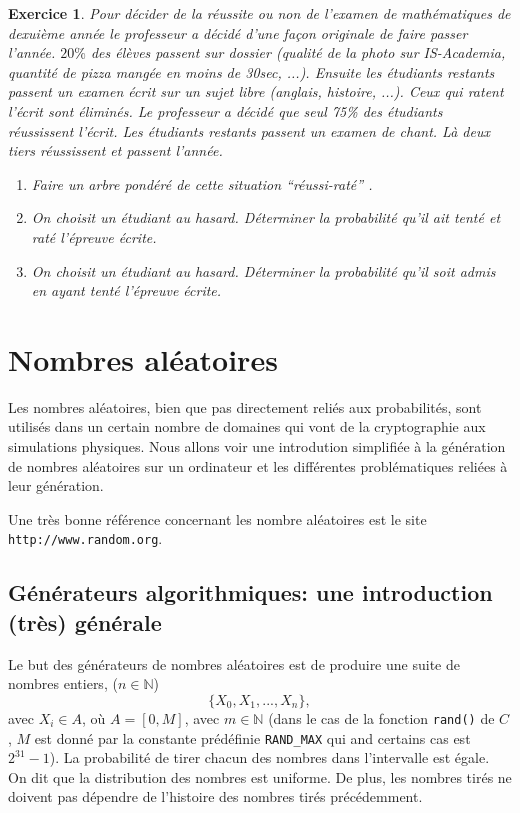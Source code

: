 \documentclass[a4paper,12pt]{book}
\renewcommand{\natural}{\mathbb{N}}
\newtheorem*{exercice}{Exercice}
\begin{document}
\begin{exercice}
Pour décider de la réussite ou non de l'examen de mathématiques de dexuième année le professeur a décidé d'une façon originale de faire passer l'année.
$20\%$ des élèves passent sur dossier (qualité de la photo sur IS-Academia, quantité de pizza mangée en moins de 30sec, ...). Ensuite
les étudiants restants passent un examen écrit sur un sujet libre (anglais, histoire, ...). 
Ceux qui ratent l'écrit sont éliminés. Le professeur
a décidé que seul 75\% des étudiants réussissent l'écrit.
Les étudiants restants passent un examen de chant. Là deux tiers réussissent et passent l'année.

\begin{enumerate}
 \item Faire un arbre pondéré de cette situation ``réussi-raté'' .
 \item On choisit un étudiant au hasard. Déterminer la probabilité qu'il ait tenté et raté l'épreuve écrite.
 \item On choisit un étudiant au hasard. Déterminer la probabilité qu'il soit admis en ayant tenté l'épreuve écrite.
\end{enumerate}
\end{exercice}




\section{Nombres aléatoires}

Les nombres aléatoires, bien que pas directement reliés aux probabilités, sont utilisés dans un certain nombre de domaines
qui vont de la cryptographie aux simulations physiques. Nous allons voir une introdution simplifiée à la génération de nombres aléatoires
sur un ordinateur et les différentes problématiques reliées à leur génération.

Une très bonne référence concernant les nombre aléatoires est le site \texttt{http://www.random.org}.

\subsection{Générateurs algorithmiques: une introduction (très) générale}

Le but des générateurs de nombres aléatoires est de produire une suite de nombres entiers,
($n\in\natural$)
\begin{equation*}
 \{X_0,X_1,...,X_n\},
\end{equation*}
avec $X_i\in A$, où $A=[0,M]$, avec $m\in \natural$ (dans le cas de la fonction \texttt{rand()}
de $C$, $M$ est donné par la constante prédéfinie \texttt{RAND\_MAX} qui and certains cas est $2^{31}-1$). La probabilité 
de tirer chacun des nombres dans l'intervalle est égale. On dit que la distribution des nombres est uniforme.
De plus, les nombres tirés ne doivent pas dépendre de l'histoire des nombres tirés précédemment. 
\end{document}
